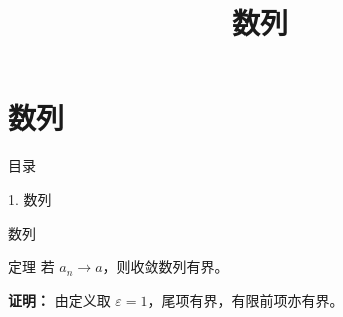 \documentclass[aspectratio=169,10pt,fontset=fandol]{ctexbeamer}
\title{数列}
\begin{document}
\section{数列}
\begin{frame}[t,fragile]{目录}
\normalsize
{\color{blue}\normalsize 1. 数列\par}\vspace{0.22em}
\end{frame}
\begin{frame}[t,fragile]{数列}
\normalsize
\begin{block}{定理}
{\normalsize
若 $a_n\to a$，则收敛数列有界。
}
\end{block}
\pause
{\normalsize
\textbf{证明：}
由定义取 $\varepsilon=1$，尾项有界，有限前项亦有界。
}
\end{frame}
\end{document}
